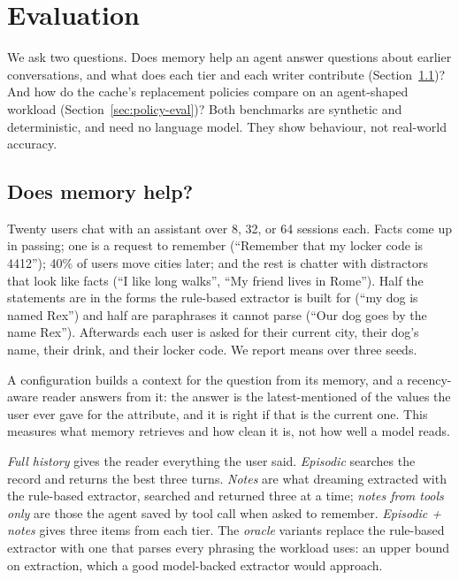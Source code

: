\section{Evaluation}
\label{sec:eval}

We ask two questions. Does memory help an agent answer questions about earlier
conversations, and what does each tier and each writer contribute (Section~\ref{sec:memory-eval})?
And how do the cache's replacement policies compare on an agent-shaped workload
(Section~\ref{sec:policy-eval})? Both benchmarks are synthetic and deterministic, and
need no language model. They show behaviour, not real-world accuracy.

\subsection{Does memory help?}
\label{sec:memory-eval}

Twenty users chat with an assistant over 8, 32, or 64 sessions each. Facts come up in
passing; one is a request to remember (``Remember that my locker code is 4412'');
40\% of users move cities later; and the rest is chatter with distractors that look
like facts (``I like long walks'', ``My friend lives in Rome''). Half the statements
are in the forms the rule-based extractor is built for (``my dog is named Rex'') and
half are paraphrases it cannot parse (``Our dog goes by the name Rex''). Afterwards
each user is asked for their current city, their dog's name, their drink, and their
locker code. We report means over three seeds.

A configuration builds a context for the question from its memory, and a
recency-aware reader answers from it: the answer is the latest-mentioned of the
values the user ever gave for the attribute, and it is right if that is the current
one. This measures what memory retrieves and how clean it is, not how well a model
reads.

\emph{Full history} gives the reader everything the user said. \emph{Episodic}
searches the record and returns the best three turns. \emph{Notes} are what dreaming
extracted with the rule-based extractor, searched and returned three at a time;
\emph{notes from tools only} are those the agent saved by tool call when asked to
remember. \emph{Episodic + notes} gives three items from each tier. The \emph{oracle}
variants replace the rule-based extractor with one that parses every phrasing the
workload uses: an upper bound on extraction, which a good model-backed extractor
would approach.

